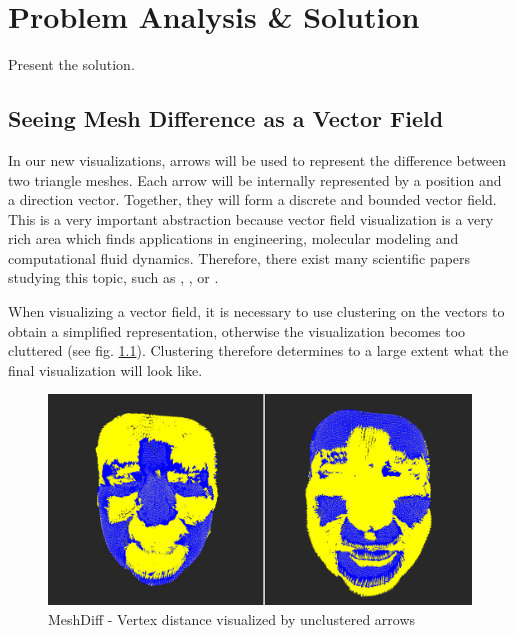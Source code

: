 \chapter{Problem Analysis \& Solution}

Present the solution.

\section{Seeing Mesh Difference as a Vector Field}

In our new visualizations, arrows will be used to represent the difference between two triangle meshes. Each arrow will be internally represented by a position and a direction vector. Together, they will form a discrete and bounded vector field. This is a very important abstraction because vector field visualization is a very rich area which finds applications in engineering, molecular modeling and computational fluid dynamics. Therefore, there exist many scientific papers studying this topic, such as \citet{Telea99}, \citet{Garcke00}, \citet{Du04} or \citet{Peng12}.

When visualizing a vector field, it is necessary to use clustering on the vectors to obtain a simplified representation, otherwise the visualization becomes too cluttered (see fig. \ref{fig:meshdiff_unclustered}). Clustering therefore determines to a large extent what the final visualization will look like.

\begin{figure}[h]
\centering
\includegraphics[width=\textwidth]{./img/meshdiff-unclustered_arrows.PNG}
\caption{MeshDiff - Vertex distance visualized by unclustered arrows}
\label{fig:meshdiff_unclustered}
\end{figure}
